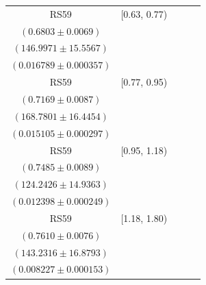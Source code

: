 {\begin{longtable}{|c|c|c|c|c|}
RS59 & [0.63, 0.77) & \begin{tabular}{@{}c@{}}$0.7044 \pm 0.0090$ \\ $(0.6803 \pm 0.0069)$\end{tabular} & \begin{tabular}{@{}c@{}}$141.9653 \pm 15.0242$ \\ $(146.9971 \pm 15.5567)$\end{tabular} & \begin{tabular}{@{}c@{}}$0.014024 \pm 0.000611$ \\ $(0.016789 \pm 0.000357)$\end{tabular} \\ \hline
RS59 & [0.77, 0.95) & \begin{tabular}{@{}c@{}}$0.7184 \pm 0.0080$ \\ $(0.7169 \pm 0.0087)$\end{tabular} & \begin{tabular}{@{}c@{}}$168.4233 \pm 16.4106$ \\ $(168.7801 \pm 16.4454)$\end{tabular} & \begin{tabular}{@{}c@{}}$0.013390 \pm 0.000525$ \\ $(0.015105 \pm 0.000297)$\end{tabular} \\ \hline
RS59 & [0.95, 1.18) & \begin{tabular}{@{}c@{}}$0.7080 \pm 0.0090$ \\ $(0.7485 \pm 0.0089)$\end{tabular} & \begin{tabular}{@{}c@{}}$131.3576 \pm 15.7916$ \\ $(124.2426 \pm 14.9363)$\end{tabular} & \begin{tabular}{@{}c@{}}$0.011870 \pm 0.000457$ \\ $(0.012398 \pm 0.000249)$\end{tabular} \\ \hline
RS59 & [1.18, 1.80) & \begin{tabular}{@{}c@{}}$0.6911 \pm 0.0106$ \\ $(0.7610 \pm 0.0076)$\end{tabular} & \begin{tabular}{@{}c@{}}$157.7256 \pm 18.5874$ \\ $(143.2316 \pm 16.8793)$\end{tabular} & \begin{tabular}{@{}c@{}}$0.007876 \pm 0.000279$ \\ $(0.008227 \pm 0.000153)$\end{tabular} \\ \hline
\end{longtable}
}
